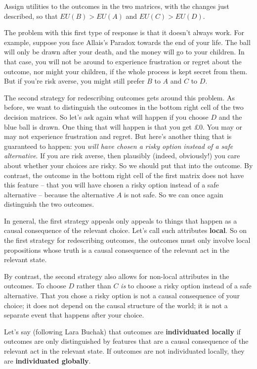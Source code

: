 \begin{exercise1}
  Assign utilities to the outcomes in the two matrices, with the
  changes just described, so that $EU(B) > EU(A)$ and $EU(C) >
  EU(D)$. 
\end{exercise1}

The problem with this first type of response is that it doesn't always
work. For example, suppose you face Allais's Paradox towards the end
of your life. The ball will only be drawn after your death, and the
money will go to your children. In that case, you will not be around
to experience frustration or regret about the outcome, nor might your
children, if the whole process is kept secret from them. But if you're
risk averse, you might still prefer $B$ to $A$ and $C$ to
$D$.

The second strategy for redescribing outcomes gets around this
problem. As before, we want to distinguish the outcomes in the bottom
right cell of the two decision matrices. So let's ask again what will
happen if you choose $D$ and the blue ball is drawn. One thing that
will happen is that you get £0. You may or may not experience
frustration and regret. But here's another thing that is guaranteed to
happen: you \emph{will have chosen a risky option instead of a safe
  alternative}. If you are risk averse, then plausibly (indeed,
obviously!) you care about whether your choices are risky. So we
should put that into the outcome. By contrast, the outcome in the
bottom right cell of the first matrix does not have this feature --
that you will have chosen a risky option instead of a safe alternative
-- because the alternative $A$ is not safe.  So we can once again
distinguish the two outcomes.

In general, the first strategy appeals only appeals to things that
happen as a causal consequence of the relevant choice. Let's call such
attributes \textbf{local}. So on the first strategy for redescribing
outcomes, the outcomes must only involve local propositions whose
truth is a causal consequence of the relevant act in the relevant
state.

By contrast, the second strategy also allows for non-local attributes
in the outcomes. To choose $D$ rather than $C$ \emph{is} to choose a
risky option instead of a safe alternative. That you chose a risky
option is not a causal consequence of your choice; it does not depend
on the causal structure of the world; it is not a separate event that
happens after your choice.

Let's say (following Lara Buchak) that outcomes are
\textbf{individuated locally} if outcomes are only distinguished by
features that are a causal consequence of the relevant act in the
relevant state. If outcomes are not individuated locally, they are
\textbf{individuated globally}.

